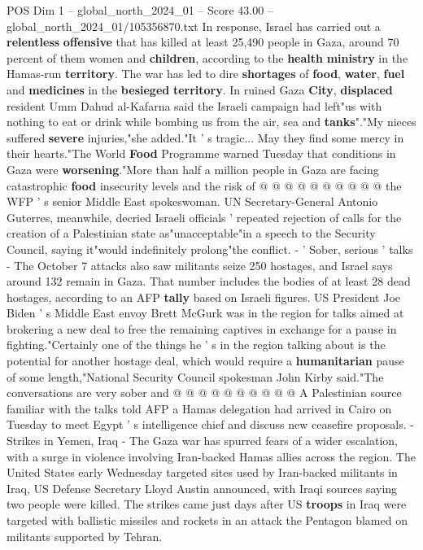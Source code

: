 \begin{textsample}{POS Dim 1 – global\_north\_2024\_01 – Score 43.00 – global\_north\_2024\_01/105356870.txt}
In response, Israel has carried out a \textbf{relentless} \textbf{offensive} that has killed at least 25,490 people in Gaza, around 70 percent of them women and \textbf{children}, according to the \textbf{health} \textbf{ministry} in the Hamas-run \textbf{territory}.
The war has led to dire \textbf{shortages} of \textbf{food}, \textbf{water}, \textbf{fuel} and \textbf{medicines} in the \textbf{besieged} \textbf{territory}.
In ruined Gaza \textbf{City}, \textbf{displaced} resident Umm Dahud al-Kafarna said the Israeli campaign had left"us with nothing to eat or drink while bombing us from the air, sea and \textbf{tanks}"."My nieces suffered \textbf{severe} injuries,"she added."It ' s tragic...
May they find some mercy in their hearts."The World \textbf{Food} Programme warned Tuesday that conditions in Gaza were \textbf{worsening}."More than half a million people in Gaza are facing catastrophic \textbf{food} insecurity levels and the risk of @ @ @ @ @ @ @ @ @ @ the WFP ' s senior Middle East spokeswoman.
UN Secretary-General Antonio Guterres, meanwhile, decried Israeli officials ' repeated rejection of calls for the creation of a Palestinian state as"unacceptable"in a speech to the Security Council, saying it"would indefinitely prolong"the conflict. - ' Sober, serious ' talks - The October 7 attacks also saw militants seize 250 hostages, and Israel says around 132 remain in Gaza.
That number includes the bodies of at least 28 dead hostages, according to an AFP \textbf{tally} based on Israeli figures.
US President Joe Biden ' s Middle East envoy Brett McGurk was in the region for talks aimed at brokering a new deal to free the remaining captives in exchange for a pause in fighting."Certainly one of the things he ' s in the region talking about is the potential for another hostage deal, which would require a \textbf{humanitarian} pause of some length,"National Security Council spokesman John Kirby said."The conversations are very sober and @ @ @ @ @ @ @ @ @ @ A Palestinian source familiar with the talks told AFP a Hamas delegation had arrived in Cairo on Tuesday to meet Egypt ' s intelligence chief and discuss new ceasefire proposals. - Strikes in Yemen, Iraq - The Gaza war has spurred fears of a wider escalation, with a surge in violence involving Iran-backed Hamas allies across the region.
The United States early Wednesday targeted sites used by Iran-backed militants in Iraq, US Defense Secretary Lloyd Austin announced, with Iraqi sources saying two people were killed.
The strikes came just days after US \textbf{troops} in Iraq were targeted with ballistic missiles and rockets in an attack the Pentagon blamed on militants supported by Tehran.

\end{textsample}
